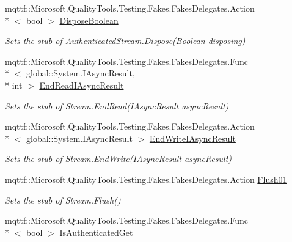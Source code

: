 \begin{DoxyCompactItemize}
mqttf\-::\-Microsoft.\-Quality\-Tools.\-Testing.\-Fakes.\-Fakes\-Delegates.\-Action\\*
$<$ bool $>$ \hyperlink{class_system_1_1_net_1_1_security_1_1_fakes_1_1_stub_authenticated_stream_af0bbd31ecc9fc055224381879c8bfe94}{Dispose\-Boolean}
\begin{DoxyCompactList}\small\item\em Sets the stub of Authenticated\-Stream.\-Dispose(\-Boolean disposing)\end{DoxyCompactList}\item 
mqttf\-::\-Microsoft.\-Quality\-Tools.\-Testing.\-Fakes.\-Fakes\-Delegates.\-Func\\*
$<$ global\-::\-System.\-I\-Async\-Result, \\*
int $>$ \hyperlink{class_system_1_1_net_1_1_security_1_1_fakes_1_1_stub_authenticated_stream_aa340d843e7a32798dfcfd4c949d15c7a}{End\-Read\-I\-Async\-Result}
\begin{DoxyCompactList}\small\item\em Sets the stub of Stream.\-End\-Read(\-I\-Async\-Result async\-Result)\end{DoxyCompactList}\item 
mqttf\-::\-Microsoft.\-Quality\-Tools.\-Testing.\-Fakes.\-Fakes\-Delegates.\-Action\\*
$<$ global\-::\-System.\-I\-Async\-Result $>$ \hyperlink{class_system_1_1_net_1_1_security_1_1_fakes_1_1_stub_authenticated_stream_ac789c142ac2799d030e99ded8e9b71d4}{End\-Write\-I\-Async\-Result}
\begin{DoxyCompactList}\small\item\em Sets the stub of Stream.\-End\-Write(\-I\-Async\-Result async\-Result)\end{DoxyCompactList}\item 
mqttf\-::\-Microsoft.\-Quality\-Tools.\-Testing.\-Fakes.\-Fakes\-Delegates.\-Action \hyperlink{class_system_1_1_net_1_1_security_1_1_fakes_1_1_stub_authenticated_stream_abd5adaec9765b16dacf7cf21e3992585}{Flush01}
\begin{DoxyCompactList}\small\item\em Sets the stub of Stream.\-Flush()\end{DoxyCompactList}\item 
mqttf\-::\-Microsoft.\-Quality\-Tools.\-Testing.\-Fakes.\-Fakes\-Delegates.\-Func\\*
$<$ bool $>$ \hyperlink{class_system_1_1_net_1_1_security_1_1_fakes_1_1_stub_authenticated_stream_aaafcca4332bc60a3eaa3058159e990f0}{Is\-Authenticated\-Get}

\end{DoxyCompactItemize}
